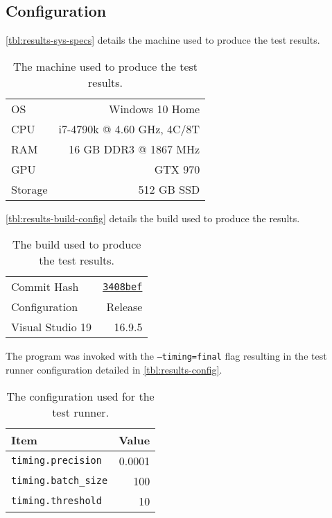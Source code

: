 \subsection{Configuration}

\autoref{tbl:results-sys-specs} details the machine used to produce the test results.

\begin{table}[H] 
    \centering
    \begin{tabular}{l|r}
        \toprule

        OS & Windows 10 Home \\
        CPU & i7-4790k @ 4.60 GHz, 4C/8T \\
        RAM & 16 GB DDR3 @ 1867 MHz \\
        GPU & GTX 970 \\
        Storage & 512 GB SSD \\

        \bottomrule
    \end{tabular}
    \caption{The machine used to produce the test results.}
    \label{tbl:results-sys-specs}
\end{table}

\autoref{tbl:results-build-config} details the build used to produce the results.

\begin{table}[H] 
    \centering
    \begin{tabular}{l|r}
        \toprule

        Commit Hash & \href{https://github.com/QFSW/JiTBoy/tree/3408bef93611b8363f274e558b06c89e7445a522}{\texttt{3408bef}} \\
        Configuration & Release \\
        Visual Studio 19 & 16.9.5 \\

        \bottomrule
    \end{tabular}
    \caption{The build used to produce the test results.}
    \label{tbl:results-build-config}
\end{table}

The program was invoked with the \texttt{--timing=final} flag resulting in the test runner configuration detailed in \autoref{tbl:results-config}.

\begin{table}[H] 
    \centering
    \begin{tabular}{l|r}
        \toprule
        Item & Value \\
        \midrule

        \texttt{timing.precision} & 0.0001 \\
        \texttt{timing.batch\_size} & 100 \\
        \texttt{timing.threshold} & 10 \\

        \bottomrule
    \end{tabular}
    \caption{The configuration used for the test runner.}
    \label{tbl:results-config}
\end{table}